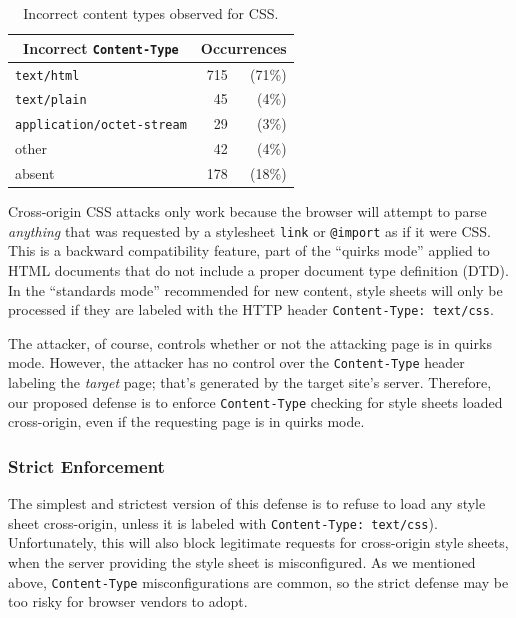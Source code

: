 \documentclass{acm_proc_article-sp}
\begin{document}
\begin{table}[b]
\centering
\begin{tabular}{lrr}
\toprule
\multicolumn{1}{c}{Incorrect \texttt{Content-Type}}&
\multicolumn{2}{c}{Occurrences}\\
\midrule
               \texttt{text/html}& 715& (71\%)\\
              \texttt{text/plain}&  45&  (4\%)\\
\texttt{application/octet-stream}&  29&  (3\%)\\
                            other&  42&  (4\%)\\
                           absent& 178& (18\%)\\
\bottomrule
\end{tabular}
\caption{Incorrect content types observed for CSS.}
\label{table:MIME}
\end{table}

Cross-origin CSS attacks only work because the browser will attempt to
parse \emph{anything} that was requested by a stylesheet \verb|link|
or \verb|@import| as if it were CSS.  This is a backward compatibility
feature, part of the “quirks mode” applied to HTML documents that do
not include a proper document type definition (DTD).  In the
“standards mode” recommended for new content, style sheets will only
be processed if they are labeled with the HTTP header
\verb|Content-Type: text/css|.

The attacker, of course, controls whether or not the attacking page is
in quirks mode.  However, the attacker has no control over the
\verb|Content-Type| header labeling the \emph{target} page; that's
generated by the target site's server.  Therefore, our proposed
defense is to enforce \verb|Content-Type| checking for style sheets
loaded cross-origin, even if the requesting page is in quirks mode.

\subsubsection{Strict Enforcement}
The simplest and strictest version of this defense is to refuse to
load any style sheet cross-origin, unless it is labeled with
\verb|Content-Type: text/css|).  Unfortunately, this will also block
legitimate requests for cross-origin style sheets, when the server
providing the style sheet is misconfigured.  As we mentioned above,
\verb|Content-Type| misconfigurations are common, so the strict
defense may be too risky for browser vendors to adopt.
\end{document}

